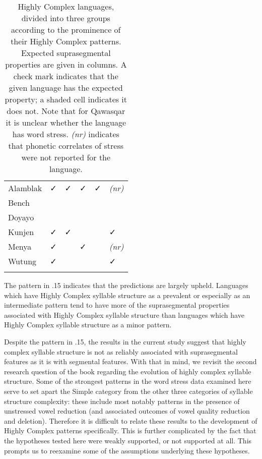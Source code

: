 \begin{table}
\begin{tabularx}{\textwidth}{XXXXXX}
\hhline{~-----}
 Alamblak & ✓ & ✓ & ✓ & ✓ & \textit{(nr)}\\
\hhline{~-----}
 Bench &  &  &  &  & \\
\hhline{~-----}
 Doyayo &  &  &  &  & \\
\hhline{~-----}
 Kunjen & ✓ & ✓ &  &  & ✓\\
\hhline{~-----}
 Menya & ✓ &  & ✓ &  & \textit{(nr)}\\
\hhline{~-----}
 Wutung & ✓ &  &  &  & ✓\\
\lspbottomrule
\end{tabularx}
\caption{\label{5.15}Highly Complex languages, divided into three groups according to the prominence of their Highly Complex patterns. Expected suprasegmental properties are given in columns. A check mark indicates that the given language has the expected property; a shaded cell indicates it does not. Note that for Qawasqar it is unclear whether the language has word stress. \textit{(nr)} indicates that phonetic correlates of stress were not reported for the language.}
\end{table}

  The pattern in .15 indicates that the predictions are largely upheld. Languages which have Highly Complex syllable structure as a prevalent or especially as an intermediate pattern tend to have more of the suprasegmental properties associated with Highly Complex syllable structure than languages which have Highly Complex syllable structure as a minor pattern.

  Despite the pattern in .15, the results in the current study suggest that highly complex syllable structure is not as reliably associated with suprasegmental features as it is with segmental features. With that in mind, we revisit the second research question of the book regarding the evolution of highly complex syllable structure. Some of the strongest patterns in the word stress data examined here serve to set apart the Simple category from the other three categories of syllable structure complexity: these include most notably patterns in the presence of unstressed vowel reduction (and associated outcomes of vowel quality reduction and deletion). Therefore it is difficult to relate these results to the development of Highly Complex patterns specifically. This is further complicated by the fact that the hypotheses tested here were weakly supported, or not supported at all. This prompts us to reexamine some of the assumptions underlying these hypotheses.

